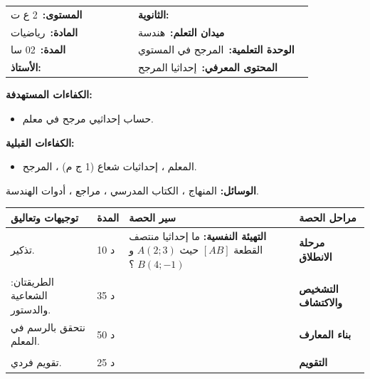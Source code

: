 \documentclass[12pt,a4paper]{article}
\makeatletter
\newenvironment{LTR}{\begin{otherlanguage}{english}}{\end{otherlanguage}}
\newcommand{\ar}[1]{\foreignlanguage{arabic}{#1}}
\newcommand{\Phase}[1]{\textbf{#1}}
\newcommand{\Fld}[2]{\textbf{#1:}\ #2}
\newcommand{\ModhHead}[9]{%
\begin{LTR}
\begin{tcolorbox}[enhanced,colback=white,colframe=cThm!85!black,arc=4mm,boxrule=1pt,top=14pt,bottom=6pt,left=8pt,right=8pt,
 overlay={\node[fill=cThm!85!black,text=white,rounded corners=3mm,inner xsep=14pt,inner ysep=4pt,font=\large\bfseries] at ([yshift=0pt]frame.north){\ar{مذكرة رقم #1}};},
 before upper={\selectlanguage{arabic}}]
\begin{tabular}{@{}p{0.4\linewidth}p{0.55\linewidth}@{}}
\Fld{المستوى}{#2} & \Fld{الثانوية}{\dotfill}\\[3pt]
\Fld{المادة}{رياضيات} & \Fld{ميدان التعلم}{#3}\\[3pt]
\Fld{المدة}{#5} & \Fld{الوحدة التعلمية}{#4}\\[3pt]
\Fld{الأستاذ}{\dotfill} & \Fld{المحتوى المعرفي}{#6}\\
\end{tabular}
\end{tcolorbox}
\begin{tcolorbox}[enhanced,colback=white,colframe=cThm!85!black,arc=3mm,boxrule=0.8pt,sidebyside,sidebyside align=top,lefthand ratio=0.5,
 segmentation style={dashed,cThm!60},before upper={\selectlanguage{arabic}},before lower={\selectlanguage{arabic}}]
\textbf{الكفاءات المستهدفة:}\par #8
\tcblower
\textbf{الكفاءات القبلية:}\par #7
\end{tcolorbox}
\end{LTR}
\par\smallskip\textbf{الوسائل:} #9\par\smallskip}
\newenvironment{Sayr}{%
\begin{LTR}\renewcommand{\arraystretch}{1.25}
\begin{longtable}{|p{0.17\textwidth}|>{\centering\arraybackslash}p{0.06\textwidth}|p{0.53\textwidth}|>{\centering\arraybackslash}p{0.12\textwidth}|}
\hline\rowcolor{cThm!12}\ar{\textbf{توجيهات وتعاليق}} & \ar{\textbf{المدة}} & \ar{\textbf{سير الحصة}} & \ar{\textbf{مراحل الحصة}}\\\hline\endhead
\hline\endfoot}{\end{longtable}\end{LTR}}
\newcommand{\Row}[4]{\ar{\small #4} & \ar{#3} & \ar{#2} & \cellcolor{cThm!8}\ar{\Phase{#1}}\\\hline}
\newcommand{\Lab}[2]{\foreignlanguage{english}{\tcbox[on line,colback=#1,colframe=#1,boxrule=0pt,arc=2pt,boxsep=1pt,left=5pt,right=5pt,top=1pt,bottom=1pt]{\ar{\textcolor{white}{\textbf{#2}}}}}}
\newcommand{\ck}{\ensuremath{{\color{cRem}\checkmark}}}
\makeatother
\begin{document}
\newpage
\ModhHead{28}{2 ع ت}{هندسة}{المرجح في المستوي}{02 سا}{إحداثيا المرجح}%
{\begin{itemize}\item المعلم ، إحداثيات شعاع (1 ج م) ، المرجح.\end{itemize}}%
{\begin{itemize}\item حساب إحداثيي مرجح في معلم.\end{itemize}}%
{المنهاج ، الكتاب المدرسي ، مراجع ، أدوات الهندسة.}
\begin{Sayr}
\Row{مرحلة الانطلاق}{%
\textbf{التهيئة النفسية:} ما إحداثيا منتصف القطعة $[AB]$ حيث $A(2;3)$ و $B(4;-1)$ ؟}{10 د}{تذكير.}
\Row{التشخيص والاكتشاف}{%
\Lab{cEx}{وضعية مقترحة}\ $G$ مرجح $\{(A;1),(B;2)\}$ مع $A(2;3)$ و $B(-1;0)$.\par\ck\ $\overrightarrow{AG}=\frac23\overrightarrow{AB}$: $x_G-2=\frac23(-3)$ ، $y_G-3=\frac23(-3)$ ، إذن $G(0;1)$.\par
\ck\ نلاحظ: $x_G=\dfrac{1\times2+2\times(-1)}3=0$ و $y_G=\dfrac{1\times3+2\times0}3=1$.\par
}{35 د}{الطريقتان: الشعاعية والدستور.}
\Row{بناء المعارف}{%
\Lab{cThm}{خاصية}\ $G$ مرجح $\{(A;\alpha),(B;\beta),(C;\gamma)\}$:\par\ck\ $x_G=\dfrac{\alpha x_A+\beta x_B+\gamma x_C}{\alpha+\beta+\gamma}$ ، $y_G=\dfrac{\alpha y_A+\beta y_B+\gamma y_C}{\alpha+\beta+\gamma}$.\par
\Lab{cEx}{مثال}\ $A(1;2)$ ، $B(4;-1)$ ، $C(-2;5)$ ، المعاملات $1$ ، $2$ ، $3$: $x_G=\dfrac{1+8-6}6=\dfrac12$ ، $y_G=\dfrac{2-2+15}6=\dfrac52$.\par}{50 د}{نتحقق بالرسم في المعلم.}
\Row{}{%
\Lab{cRem}{ملاحظات}\ الإحداثيان «متوسطان مرجحان» للإحداثيات ، كالمعدل الفصلي.\par\Lab{cThm!80!black}{حذار}\ نقسم على مجموع المعاملات لا على عدد النقط.}{}{}
\Row{التقويم}{%
\Lab{cEx}{تطبيق}\par $A(0;1)$ و $B(3;1)$. عيّن عددين $\alpha$ و $\beta$ حتى تكون $G(2;1)$ مرجح $\{(A;\alpha),(B;\beta)\}$.\par\textbf{الحل:} $\overrightarrow{AG}=\frac23\overrightarrow{AB}$ ، إذن $\dfrac\beta{\alpha+\beta}=\dfrac23$: مثلاً $\alpha=1$ ، $\beta=2$.\par\textbf{واجب منزلي:} تمارين 89 إلى 96 من باب المرجح.\par\smallskip\textbf{ملاحظات حول سير الحصة:} \dotfill}{25 د}{تقويم فردي.}
\end{Sayr}
\newpage
{}%
\end{document}
